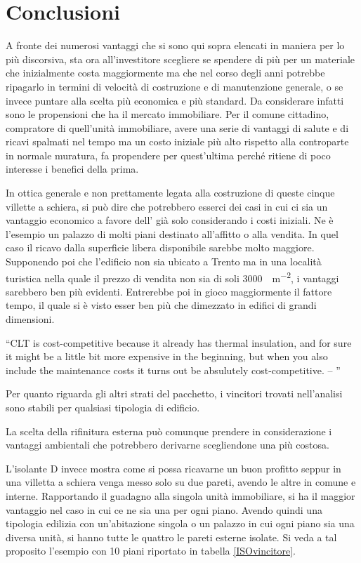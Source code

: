 \section{Conclusioni}
A fronte dei numerosi vantaggi che si sono qui sopra elencati in maniera per lo più discorsiva, sta ora all'investitore scegliere se spendere di più per un materiale che inizialmente costa maggiormente ma che nel corso degli anni potrebbe ripagarlo in termini di velocità di costruzione e di manutenzione generale, o se invece puntare alla scelta più economica e più standard.
Da considerare infatti sono le propensioni che ha il mercato immobiliare. 
Per il comune cittadino, compratore di quell'unità immobiliare, avere una serie di vantaggi di salute e di ricavi spalmati nel tempo ma un costo iniziale più alto rispetto alla controparte in normale muratura, fa propendere per quest'ultima perché ritiene di poco interesse i benefici della prima.

In ottica generale e non prettamente legata alla costruzione di queste cinque villette a schiera, si può dire che potrebbero esserci dei casi in cui ci sia un vantaggio economico a favore dell'\xlam{} già solo considerando i costi iniziali. 
Ne è l'esempio un palazzo di molti piani destinato all'affitto o alla vendita.
In quel caso il ricavo dalla superficie libera disponibile sarebbe molto maggiore.
Supponendo poi che l'edificio non sia ubicato a Trento ma in una località turistica nella quale il prezzo di vendita non sia di soli \SI{3000}{\teuro \per \square\metre}, i vantaggi sarebbero ben più evidenti.
Entrerebbe poi in gioco maggiormente il fattore tempo, il quale si è visto esser ben più che dimezzato in edifici di grandi dimensioni.


\vspace{1cm}
\noindent \enquote{CLT is cost-competitive because it already has thermal insulation, \omissis{} and for sure it might be a little bit more expensive in the beginning, but when you also include the maintenance costs it turns out be absulutely cost-competitive. -- \textcite{mallo_outlook_2014}}

\vspace{1cm}
Per quanto riguarda gli altri strati del pacchetto, i vincitori trovati nell'analisi sono stabili per qualsiasi tipologia di edificio.

La scelta della rifinitura esterna può comunque prendere in considerazione i vantaggi ambientali che potrebbero derivarne scegliendone una più costosa.

L'isolante D invece mostra come si possa ricavarne un buon profitto seppur in una villetta a schiera venga messo solo su due pareti, avendo le altre in comune e interne. 
Rapportando il guadagno alla singola unità immobiliare, si ha il maggior vantaggio nel caso in cui ce ne sia una per ogni piano. 
Avendo quindi una tipologia edilizia con un'abitazione singola o un palazzo in cui ogni piano sia una diversa unità, si hanno tutte le quattro le pareti esterne isolate. 
Si veda a tal proposito l'esempio con 10 piani riportato in tabella \ref{ISOvincitore}.